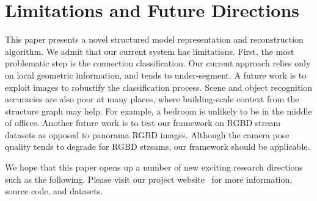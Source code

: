 \section{Limitations and Future Directions}

This paper presents a novel structured model representation and
reconstruction algorithm.
We admit that our current system has limitations. First, the most
problematic step is the connection classification. Our current approach
relies only on local geometric information, and tends to under-segment.
A future work is to exploit images to robustify the classification
process. Scene and object recognition accuracies are also poor at many
places, where building-scale context from the structure graph may
help. For example, a bedroom is unlikely to be in the middle of offices.
Another future work is to test our framework on RGBD stream datasets as
opposed to panorama RGBD images. Although the camera pose quality tends
to degrade for RGBD streams, our framework should be applicable.

We hope that
this paper opens up a number of new exciting research directions such as
the following. Please visit our project website~\cite{SIMProject} for
more information, source code, and datasets.

